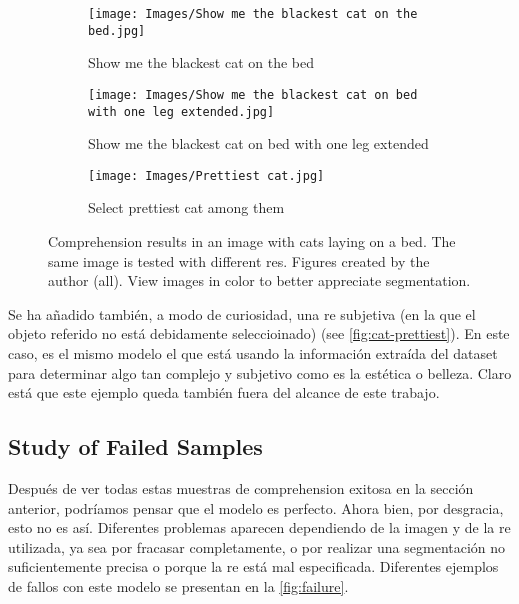\begin{figure}[p]
  \bigskip
  \begin{subfigure}[t]{.3\textwidth}
    \centering
    \caption{Show me the blackest cat on the bed}
    \texttt{[image: Images/Show me the blackest cat on the bed.jpg]}
  \end{subfigure}\hfill
  \begin{subfigure}[t]{.3\textwidth}
    \centering
    \caption{Show me the blackest cat on bed with one leg extended}
    \texttt{[image: Images/Show me the blackest cat on bed with one leg extended.jpg]}
  \end{subfigure}\hfill
  \begin{subfigure}[t]{.3\textwidth}
    \centering
    \caption{Select prettiest cat among them}\label{fig:cat-prettiest}
    \texttt{[image: Images/Prettiest cat.jpg]}
  \end{subfigure}
  \caption[Comprehension results in an image with cats]{Comprehension results
    in an image with cats laying on a bed. The same image is tested with
    different \glspl{re}. Figures created by the author (all). View images in
    color to better appreciate segmentation.}\label{fig:cats}
\end{figure}

Se ha añadido también, a modo de curiosidad, una \gls{re} subjetiva (en la que
el objeto referido no está debidamente seleccioinado) (see
\vref{fig:cat-prettiest}). En este caso, es el mismo modelo el que está usando
la información extraída del dataset para determinar algo tan complejo y
subjetivo como es la estética o belleza. Claro está que este ejemplo queda
también fuera del alcance de este trabajo.


\subsection{Study of Failed Samples}\label{sec:failed}

Después de ver todas estas muestras de comprehension exitosa en la sección
anterior, podríamos pensar que el modelo es perfecto. Ahora bien, por
desgracia, esto no es así. Diferentes problemas aparecen dependiendo de la
imagen y de la \gls{re} utilizada, ya sea por fracasar completamente, o por
realizar una segmentación no suficientemente precisa o porque la \gls{re} está
mal especificada. Diferentes ejemplos de fallos con este modelo se presentan en
la \vref{fig:failure}.

